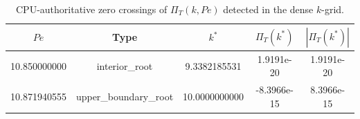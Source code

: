 \begin{table}[htbp]
\centering
\caption{CPU-authoritative zero crossings of $\Pi_T(k,Pe)$ detected in the dense $k$-grid.}
\label{tab:ultimate_roots}
\begin{ruledtabular}
\begin{tabular}{ccccc}
$Pe$ & Type & $k^*$ & $\Pi_T(k^*)$ & $|\Pi_T(k^*)|$\\
\hline
10.850000000 & interior_root & 9.3382185531 & 1.9191e-20 & 1.9191e-20\\
10.871940555 & upper_boundary_root & 10.0000000000 & -8.3966e-15 & 8.3966e-15\\
\end{tabular}
\end{ruledtabular}
\end{table}
